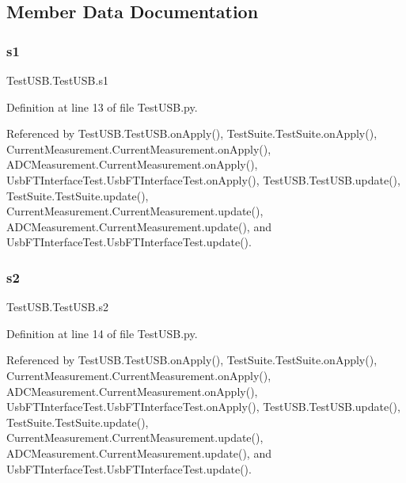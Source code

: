 \subsection{Member Data Documentation}
\mbox{\label{classTestUSB_1_1TestUSB_a1c2db95a9c835bae85479461f8c5d722}} 
\subsubsection{\texorpdfstring{s1}{s1}}
{\footnotesize\ttfamily Test\+U\+S\+B.\+Test\+U\+S\+B.\+s1}



Definition at line 13 of file Test\+U\+S\+B.\+py.



Referenced by Test\+U\+S\+B.\+Test\+U\+S\+B.\+on\+Apply(), Test\+Suite.\+Test\+Suite.\+on\+Apply(), Current\+Measurement.\+Current\+Measurement.\+on\+Apply(), A\+D\+C\+Measurement.\+Current\+Measurement.\+on\+Apply(), Usb\+F\+T\+Interface\+Test.\+Usb\+F\+T\+Interface\+Test.\+on\+Apply(), Test\+U\+S\+B.\+Test\+U\+S\+B.\+update(), Test\+Suite.\+Test\+Suite.\+update(), Current\+Measurement.\+Current\+Measurement.\+update(), A\+D\+C\+Measurement.\+Current\+Measurement.\+update(), and Usb\+F\+T\+Interface\+Test.\+Usb\+F\+T\+Interface\+Test.\+update().

\mbox{\label{classTestUSB_1_1TestUSB_adc6c526d953e95dc252a9f186c8c66d7}} 
\subsubsection{\texorpdfstring{s2}{s2}}
{\footnotesize\ttfamily Test\+U\+S\+B.\+Test\+U\+S\+B.\+s2}



Definition at line 14 of file Test\+U\+S\+B.\+py.



Referenced by Test\+U\+S\+B.\+Test\+U\+S\+B.\+on\+Apply(), Test\+Suite.\+Test\+Suite.\+on\+Apply(), Current\+Measurement.\+Current\+Measurement.\+on\+Apply(), A\+D\+C\+Measurement.\+Current\+Measurement.\+on\+Apply(), Usb\+F\+T\+Interface\+Test.\+Usb\+F\+T\+Interface\+Test.\+on\+Apply(), Test\+U\+S\+B.\+Test\+U\+S\+B.\+update(), Test\+Suite.\+Test\+Suite.\+update(), Current\+Measurement.\+Current\+Measurement.\+update(), A\+D\+C\+Measurement.\+Current\+Measurement.\+update(), and Usb\+F\+T\+Interface\+Test.\+Usb\+F\+T\+Interface\+Test.\+update().

